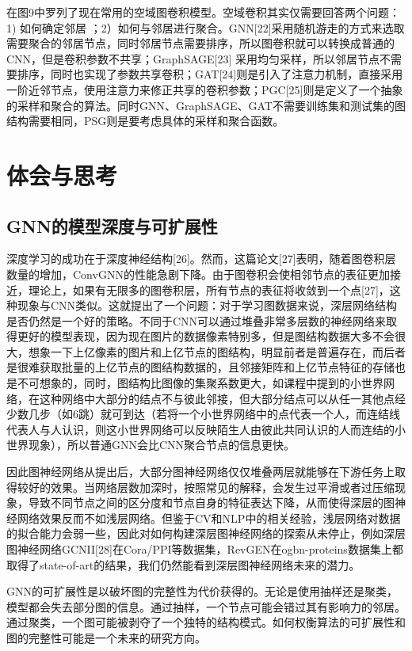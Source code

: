 \documentclass[10pt,journal,compsoc]{IEEEtran}
\begin{document}
在图9中罗列了现在常用的空域图卷积模型。空域卷积其实仅需要回答两个问题： 1) 如何确定邻居 ；2）如何与邻居进行聚合。GNN[22]采用随机游走的方式来选取需要聚合的邻居节点，同时邻居节点需要排序，所以图卷积就可以转换成普通的CNN，但是卷积参数不共享；GraphSAGE[23] 采用均匀采样，所以邻居节点不需要排序，同时也实现了参数共享卷积；GAT[24]则是引入了注意力机制，直接采用一阶近邻节点，使用注意力来修正共享的卷积参数；PGC[25]则是定义了一个抽象的采样和聚合的算法。同时GNN、GraphSAGE、GAT不需要训练集和测试集的图结构需要相同，PSG则是要考虑具体的采样和聚合函数。


\section{体会与思考}

\subsection{GNN的模型深度与可扩展性}

深度学习的成功在于深度神经结构[26]。然而，这篇论文[27]表明，随着图卷积层数量的增加，ConvGNN的性能急剧下降。由于图卷积会使相邻节点的表征更加接近，理论上，如果有无限多的图卷积层，所有节点的表征将收敛到一个点[27]，这种现象与CNN类似。这就提出了一个问题：对于学习图数据来说，深层网络结构是否仍然是一个好的策略。不同于CNN可以通过堆叠非常多层数的神经网络来取得更好的模型表现，因为现在图片的数据像素特别多，但是图结构数据大多不会很大，想象一下上亿像素的图片和上亿节点的图结构，明显前者是普遍存在，而后者是很难获取批量的上亿节点的图结构数据的，且邻接矩阵和上亿节点特征的存储也是不可想象的，同时，图结构比图像的集聚系数更大，如课程中提到的小世界网络，在这种网络中大部分的结点不与彼此邻接，但大部分结点可以从任一其他点经少数几步（如6跳）就可到达（若将一个小世界网络中的点代表一个人，而连结线代表人与人认识，则这小世界网络可以反映陌生人由彼此共同认识的人而连结的小世界现象），所以普通GNN会比CNN聚合节点的信息更快。

因此图神经网络从提出后，大部分图神经网络仅仅堆叠两层就能够在下游任务上取得较好的效果。当网络层数加深时，按照常见的解释，会发生过平滑或者过压缩现象，导致不同节点之间的区分度和节点自身的特征表达下降，从而使得深层的图神经网络效果反而不如浅层网络。但鉴于CV和NLP中的相关经验，浅层网络对数据的拟合能力会弱一些，因此对如何构建深层图神经网络的探索从未停止，例如深层图神经网络GCNII[28]在Cora/PPI等数据集，RevGEN在ogbn-proteins数据集上都取得了state-of-art的结果，我们仍然能看到深层图神经网络未来的潜力。

GNN的可扩展性是以破坏图的完整性为代价获得的。无论是使用抽样还是聚类，模型都会失去部分图的信息。通过抽样，一个节点可能会错过其有影响力的邻居。通过聚类，一个图可能被剥夺了一个独特的结构模式。如何权衡算法的可扩展性和图的完整性可能是一个未来的研究方向。
\end{document}
